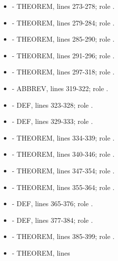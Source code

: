 \begin{itemize}
  \texttt{\protect{}}.
\item
  \texttt{\protect{}} - THEOREM, lines 273-278; role
  \texttt{\protect{}}.
\item
  \texttt{\protect{}} - THEOREM, lines 279-284; role
  \texttt{\protect{}}.
\item
  \texttt{\protect{}} - THEOREM, lines 285-290; role
  \texttt{\protect{}}.
\item
  \texttt{\protect{}} - THEOREM, lines 291-296; role
  \texttt{\protect{}}.
\item
  \texttt{\protect{}} - THEOREM, lines 297-318;
  role \texttt{\protect{}}.
\item
  \texttt{\protect{}} - ABBREV, lines 319-322; role
  \texttt{\protect{}}.
\item
  \texttt{\protect{}} - DEF, lines 323-328; role \texttt{\protect{}}.
\item
  \texttt{\protect{}} - DEF, lines 329-333; role \texttt{\protect{}}.
\item
  \texttt{\protect{}} - THEOREM, lines 334-339; role
  \texttt{\protect{}}.
\item
  \texttt{\protect{}} - THEOREM, lines 340-346; role
  \texttt{\protect{}}.
\item
  \texttt{\protect{}} - THEOREM, lines 347-354; role
  \texttt{\protect{}}.
\item
  \texttt{\protect{}} - THEOREM, lines 355-364; role
  \texttt{\protect{}}.
\item
  \texttt{\protect{}} - DEF, lines 365-376; role \texttt{\protect{}}.
\item
  \texttt{\protect{}} - DEF, lines 377-384; role \texttt{\protect{}}.
\item
  \texttt{\protect{}} - THEOREM, lines 385-399;
  role \texttt{\protect{}}.
\item
  \texttt{\protect{}} - THEOREM, lines

\end{itemize}
